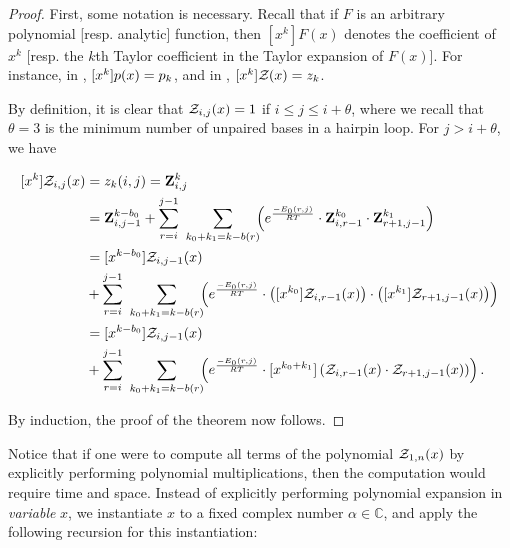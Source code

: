 \begin{proof}
First, some notation is necessary.
Recall that if $F$ is an arbitrary
polynomial [resp. analytic] function, then $[x^k]F(x)$
denotes the coefficient of $x^k$ [resp. the $k$th Taylor coefficient in the
Taylor expansion of $F(x)$]. For instance, in
, $[x^k]p(x) = p_k$, and in
, $[x^k]{\mathcal Z}_{}(x) = z_k$.

By definition, it is clear that ${\mathcal Z}_{i,j}(x)=1$ if $i \leq j \leq i + \theta$,
where we recall that $\theta = 3$ is the minimum number of unpaired bases in
a hairpin loop. For $j > i + \theta$, we have

\begin{align}
\begin{split}
[x^k] \emZ{i,j} &= z_k(i,j) = \bfZ{k}{i,j} \\
&= \bfZ{k-b_0}{i,j-1} +
\sum_{r=i}^{j-1}\hspace{2.25em} \sum_{\mathclap{k_0+k_1=k-b(r)}}\hspace{1.5em}
\left( \boltzNuss{r,j} \cdot \bfZ{k_0}{i,r-1} \cdot \bfZ{k_1}{r+1,j-1} \right) \\
&= [x^{k-b_0}] \emZ{i,j-1} \\
&+ \sum_{r=i}^{j-1}\hspace{2.25em} \sum_{\mathclap{k_0+k_1=k-b(r)}}\hspace{1.5em}
\left( \boltzNuss{r,j} \cdot \left( [x^{k_0}] \emZ{i,r-1} \right) \cdot
\left( [x^{k_1}] \emZ{r+1,j-1} \right) \right) \\
&= [x^{k-b_0}] \emZ{i,j-1} \\
&+ \sum_{r=i}^{j-1}\hspace{2.25em} \sum_{\mathclap{k_0+k_1=k-b(r)}}\hspace{1.5em}
\left( \boltzNuss{r,j} \cdot [x^{k_0+k_1}]
\left( \emZ{i,r-1} \cdot \emZ{r+1,j-1} \right) \right).\\
\end{split}
\end{align}

By induction, the proof of the theorem now follows.
\end{proof}

Notice that if one were to compute all terms of the polynomial ${\mathcal Z}_{1,n}(x)$
by explicitly performing polynomial multiplications,
then the computation would require  time and  space.
Instead of explicitly performing polynomial expansion in {\em variable} $x$,
we instantiate $x$ to a fixed complex number $\alpha \in \mathbb{C}$, and apply
the following recursion for this instantiation:

